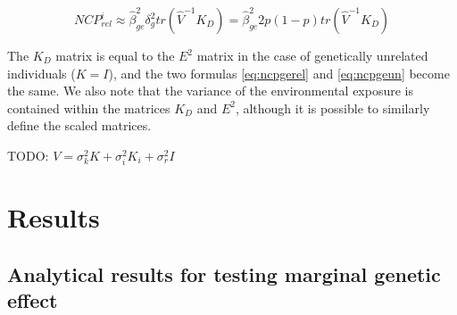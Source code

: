 \documentclass[]{book}
\theoremstyle{definition}
\theoremstyle{definition}
\theoremstyle{definition}
\theoremstyle{remark}
\begin{document}
\begin{equation} 
NCP_{rel}^i \approx \hat{\beta}_{ge}^2 \delta_g^2 tr(\hat{V}^{-1} K_{D}) = \hat{\beta}_{ge}^2 2 p (1 - p) tr(\hat{V}^{-1} K_{D})
\label{eq:ncpgerel}
\end{equation}

The \(K_{D}\) matrix is equal to the \(E^2\) matrix in the case of
genetically unrelated individuals (\(K = I\)), and the two formulas
\eqref{eq:ncpgerel} and \eqref{eq:ncpgeun} become the same. We also note
that the variance of the environmental exposure is contained within the
matrices \(K_{D}\) and \(E^2\), although it is possible to similarly
define the scaled matrices.

TODO: \(V = \sigma^2_k K + \sigma^2_i K_i + \sigma^2_r I\)
\citep{Sul2016}

\section{Results}\label{results}

\subsection{Analytical results for testing marginal genetic
effect}\label{analytical-results-for-testing-marginal-genetic-effect}
\end{document}
